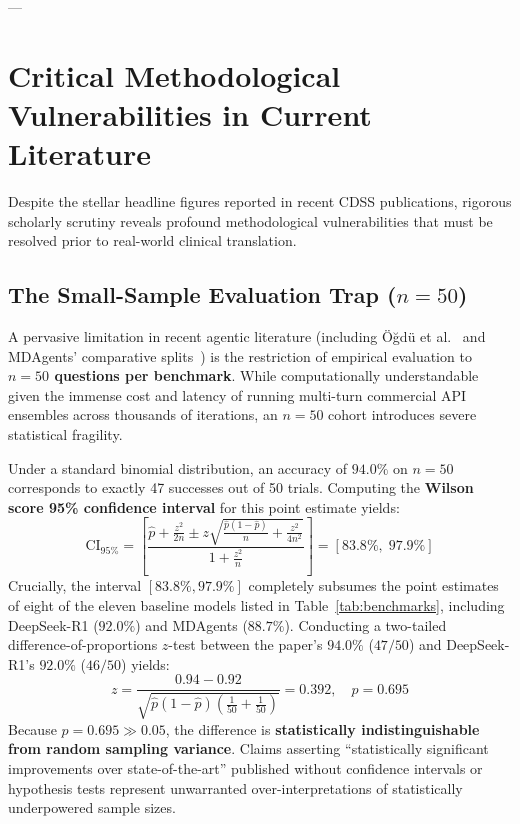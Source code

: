 \documentclass[conference]{IEEEtran}
\begin{document}
---

\section{Critical Methodological Vulnerabilities in Current Literature}

Despite the stellar headline figures reported in recent CDSS publications, rigorous scholarly scrutiny reveals profound methodological vulnerabilities that must be resolved prior to real-world clinical translation.

\subsection{The Small-Sample Evaluation Trap (\texorpdfstring{$n=50$}{n=50})}
A pervasive limitation in recent agentic literature (including Öğdü et al.~\cite{ogdu2025adaptive} and MDAgents' comparative splits~\cite{kim2024medagents}) is the restriction of empirical evaluation to \textbf{$n=50$ questions per benchmark}. While computationally understandable given the immense cost and latency of running multi-turn commercial API ensembles across thousands of iterations, an $n=50$ cohort introduces severe statistical fragility.

Under a standard binomial distribution, an accuracy of $94.0\%$ on $n=50$ corresponds to exactly 47 successes out of 50 trials. Computing the \textbf{Wilson score 95\% confidence interval} for this point estimate yields:
\begin{equation}
\text{CI}_{95\%} = \left[ \frac{\hat{p} + \frac{z^2}{2n} \pm z \sqrt{\frac{\hat{p}(1-\hat{p})}{n} + \frac{z^2}{4n^2}}}{1 + \frac{z^2}{n}} \right] = [83.8\%, \; 97.9\%]
\end{equation}
Crucially, the interval $[83.8\%, 97.9\%]$ completely subsumes the point estimates of eight of the eleven baseline models listed in Table~\ref{tab:benchmarks}, including DeepSeek-R1 ($92.0\%$) and MDAgents ($88.7\%$). Conducting a two-tailed difference-of-proportions $z$-test between the paper's $94.0\%$ ($47/50$) and DeepSeek-R1's $92.0\%$ ($46/50$) yields:
\begin{equation}
z = \frac{0.94 - 0.92}{\sqrt{\hat{p}(1-\hat{p})(\frac{1}{50} + \frac{1}{50})}} = 0.392, \quad p = 0.695
\end{equation}
Because $p = 0.695 \gg 0.05$, the difference is \textbf{statistically indistinguishable from random sampling variance}. Claims asserting ``statistically significant improvements over state-of-the-art'' published without confidence intervals or hypothesis tests represent unwarranted over-interpretations of statistically underpowered sample sizes.
\end{document}
